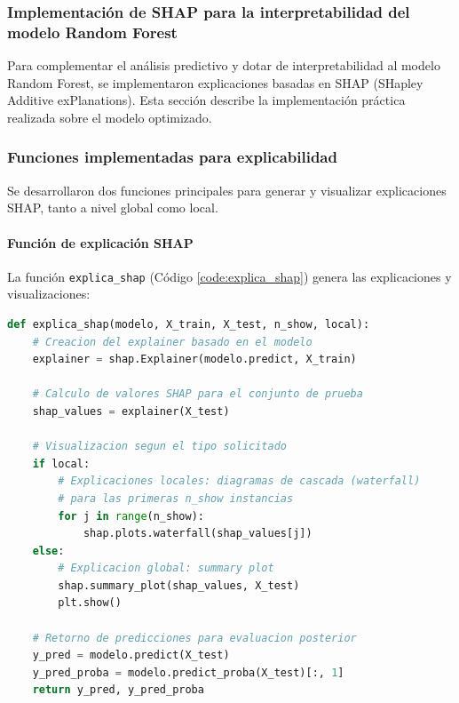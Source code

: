 \subsubsection*{Implementación de SHAP para la interpretabilidad del modelo Random Forest}

Para complementar el análisis predictivo y dotar de interpretabilidad al modelo Random Forest, se implementaron explicaciones basadas en SHAP (SHapley Additive exPlanations). Esta sección describe la implementación práctica realizada sobre el modelo optimizado.

\subsubsection*{Funciones implementadas para explicabilidad}

Se desarrollaron dos funciones principales para generar y visualizar explicaciones SHAP, tanto a nivel global como local.

\paragraph{Función de explicación SHAP}

La función \texttt{explica\_shap} (Código \ref{code:explica_shap}) genera las explicaciones y visualizaciones:

\begin{lstlisting}[language=Python, caption=Función para generar explicaciones SHAP, label=code:explica_shap]
def explica_shap(modelo, X_train, X_test, n_show, local):
    # Creacion del explainer basado en el modelo
    explainer = shap.Explainer(modelo.predict, X_train)
    
    # Calculo de valores SHAP para el conjunto de prueba
    shap_values = explainer(X_test)
    
    # Visualizacion segun el tipo solicitado
    if local:
        # Explicaciones locales: diagramas de cascada (waterfall)
        # para las primeras n_show instancias
        for j in range(n_show):
            shap.plots.waterfall(shap_values[j])
    else:
        # Explicacion global: summary plot
        shap.summary_plot(shap_values, X_test)
        plt.show()
    
    # Retorno de predicciones para evaluacion posterior
    y_pred = modelo.predict(X_test)
    y_pred_proba = modelo.predict_proba(X_test)[:, 1]
    return y_pred, y_pred_proba
\end{lstlisting}


